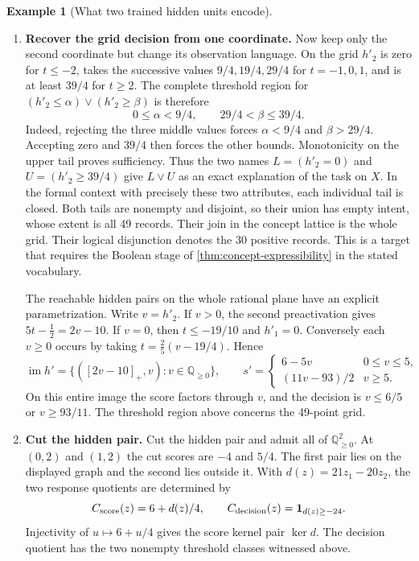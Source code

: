 \documentclass[11pt,a4paper]{article}
\theoremstyle{definition}
\newtheorem{example}[example]{Example}
\theoremstyle{remark}\newaliascnt{remark}{theorem}
\newcommand{\Q}{\mathbb Q}
\numberwithin{equation}{section}
\begin{document}
\begin{example}[What two trained hidden units encode]
\begin{enumerate}[titledsteps]
    \item \textbf{Recover the grid decision from one coordinate.} Now keep only the second coordinate but change its observation language. On the grid $h'_2$ is zero for $t\le-2$, takes the successive values $9/4,19/4,29/4$ for $t=-1,0,1$, and is at least $39/4$ for $t\ge2$. The complete threshold region for
$(h'_2\le\alpha)\vee(h'_2\ge\beta)$ is therefore
\[
       0\le\alpha<9/4,\qquad 29/4<\beta\le39/4 .
\]
Indeed, rejecting the three middle values forces $\alpha<9/4$ and $\beta>29/4$. Accepting zero and $39/4$ then forces the other bounds. Monotonicity on the upper tail proves sufficiency. Thus the two names $L=(h'_2=0)$ and $U=(h'_2\ge39/4)$ give $L\vee U$ as an exact explanation of the task on $X$. In the formal context with precisely these two attributes, each individual tail is closed. Both tails are nonempty and disjoint, so their union has empty intent, whose extent is all 49 records. Their join in the concept lattice is the whole grid. Their logical disjunction denotes the 30 positive records. This is a target that requires the Boolean stage of \cref{thm:concept-expressibility} in the stated vocabulary.

The reachable hidden pairs on the whole rational plane have an explicit parametrization. Write \(v=h'_2\). If \(v>0\), the second preactivation gives \(5t-\tfrac12=2v-10\). If \(v=0\), then \(t\le-19/10\) and \(h'_1=0\). Conversely each \(v\ge0\) occurs by taking \(t=\tfrac25(v-19/4)\). Hence
\[
 \operatorname{im}h'=\{([2v-10]_+,v):v\in\Q_{\ge0}\},\qquad
 s'=\begin{cases}6-5v&0\le v\le5,\\(11v-93)/2&v\ge5.\end{cases}
\]
On this entire image the score factors through \(v\), and the decision is \(v\le6/5\) or \(v\ge93/11\). The threshold region above concerns the 49-point grid.


    \item \textbf{Cut the hidden pair.} Cut the hidden pair and admit all of \(\Q_{\ge0}^2\). At \((0,2)\) and \((1,2)\) the cut scores are \(-4\) and \(5/4\). The first pair lies on the displayed graph and the second lies outside it. With \(d(z)=21z_1-20z_2\), the two response quotients are determined by
\[
 C_{\rm score}(z)=6+d(z)/4,\qquad C_{\rm decision}(z)=\mathbf1_{d(z)\ge-24}.
\]
Injectivity of \(u\mapsto6+u/4\) gives the score kernel pair \(\ker d\). The decision quotient has the two nonempty threshold classes witnessed above.


\end{enumerate}
\end{example}
\end{document}
